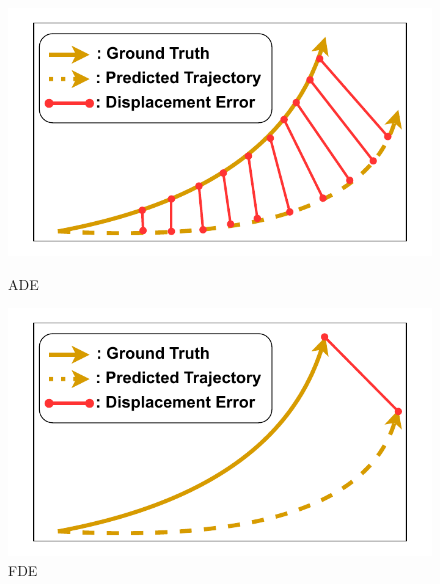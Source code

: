\begin{figure}[hbtp]
  \centering
  \begin{minipage}{0.49\textwidth}
    \centering
    \includegraphics[width=\textwidth]{images/ade.pdf}
    \caption{ADE}
    \label{fig:ade}
  \end{minipage}
  \hfill
  \begin{minipage}{0.49\textwidth}
    \centering
    \includegraphics[width=\textwidth]{images/fde.pdf}
    \caption{FDE}
    \label{fig:fde}
  \end{minipage}
\end{figure}

\newpage

